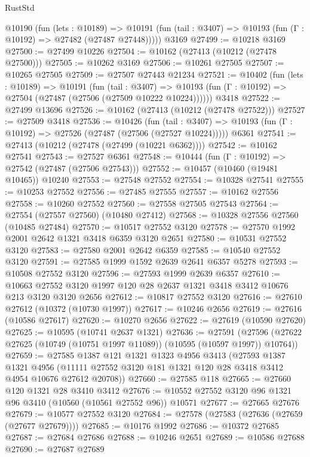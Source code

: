 \begin{lexlean}{RustStd}
\begin{coremodule}
    @10190
      (fun (lets : @10189) =>
      @10191 (fun (tail : @3407) => @10193 (fun (Γ : @10192) => @27482 (@27487 @27448)))))
    @3169
@27499 := @10218 @3169
@27500 := @27499 @10226
@27504 := @10162 (@27413 (@10212 (@27478 @27500)))
@27505 := @10262 @3169
@27506 := @10261 @27505
@27507 := @10265 @27505
@27509 := @27507 @27443 @21234
@27521 := @10402
    (fun (lets : @10189) =>
    @10191
      (fun (tail : @3407) =>
      @10193 (fun (Γ : @10192) => @27504 (@27487 (@27506 (@27509 @10222 @10224))))))
    @3418
@27522 := @27499 @13696
@27526 := @10162 (@27413 (@10212 (@27478 @27522)))
@27527 := @27509 @3418
@27536 := @10426
    (fun (tail : @3407) => @10193 (fun (Γ : @10192) => @27526 (@27487 (@27506 (@27527 @10224)))))
    @6361
@27541 := @27413 (@10212 (@27478 (@27499 (@10221 @6362))))
@27542 := @10162 @27541
@27543 := @27527 @6361
@27548 := @10444 (fun (Γ : @10192) => @27542 (@27487 (@27506 @27543)))
@27552 := @10457 (@10460 (@19481 @10465)) @10240
@27553 := @27548 @27552
@27554 := @10328 @27541
@27555 := @10253 @27552
@27556 := @27485 @27555
@27557 := @10162 @27556
@27558 := @10260 @27552
@27560 := @27558 @27505 @27543
@27564 := @27554 (@27557 @27560) (@10480 @27412)
@27568 := @10328 @27556 @27560 (@10485 @27484)
@27570 := @10517 @27552 @3120
@27578 := @27570 @1992 @2001 @2642 @1321 @3418 @6359 @3120 @2651
@27580 := @10531 @27552 @3120
@27583 := @27580 @2001 @2642 @6359
@27585 := @10540 @27552 @3120
@27591 := @27585 @1999 @1592 @2639 @2641 @6357 @5278
@27593 := @10508 @27552 @3120
@27596 := @27593 @1999 @2639 @6357
@27610 := @10663 @27552 @3120 @1997 @120 @28 @2637 @1321 @3418 @3412 @10676 @213 @3120 @3120 @2656
@27612 := @10817 @27552 @3120
@27616 := @27610 @27612 (@10372 (@10730 @1997))
@27617 := @10246 @2656
@27619 := @27616 (@10586 @27617)
@27620 := @10270 @2656
@27622 := @27619 (@10590 @27620)
@27625 := @10595 (@10741 @2637 @1321)
@27636 := @27591
    (@27596 (@27622 @27625 (@10749 (@10751 @1997 @11089)) (@10595 (@10597 @1997)) @10764))
@27659 := @27585
    @1387
    @121
    @1321
    @1323
    @4956
    @3413
    (@27593
      @1387
      @1321
      @4956
      (@11111 @27552 @3120 @181 @1321 @120 @28 @3418 @3412 @4954 @10676 @27612 @20708))
@27660 := @27585 @118
@27665 := @27660 @120 @1321 @28 @3410 @3412
@27676 := @10552 @27552 @3120 @96 @1321 @96 @3410 (@10560 (@10561 @27552 @96)) @10571
@27677 := @27665 @27676
@27679 := @10577 @27552 @3120
@27684 := @27578 (@27583 (@27636 (@27659 (@27677 @27679))))
@27685 := @10176 @1992
@27686 := @10372 @27685
@27687 := @27684 @27686
@27688 := @10246 @2651
@27689 := @10586 @27688
@27690 := @27687 @27689

\end{coremodule}
\end{lexlean}

